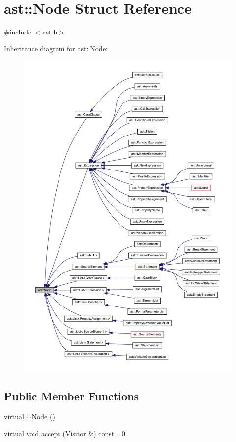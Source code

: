 \hypertarget{structast_1_1_node}{}\section{ast\+:\+:Node Struct Reference}
\label{structast_1_1_node}


{\ttfamily \#include $<$ast.\+h$>$}



Inheritance diagram for ast\+:\+:Node\+:\nopagebreak
\begin{figure}[H]
\begin{center}
\leavevmode
\includegraphics[width=350pt]{structast_1_1_node__inherit__graph}
\end{center}
\end{figure}
\subsection*{Public Member Functions}
\begin{DoxyCompactItemize}
\item 
virtual \hyperlink{structast_1_1_node_a178b5135f3dc18803c2e5997ce251738}{$\sim$\+Node} ()
\item 
virtual void \hyperlink{structast_1_1_node_abc089ee6caaf06a4445ebdd8391fdebc}{accept} (\hyperlink{structast_1_1_visitor}{Visitor} \&) const =0
\end{DoxyCompactItemize}


